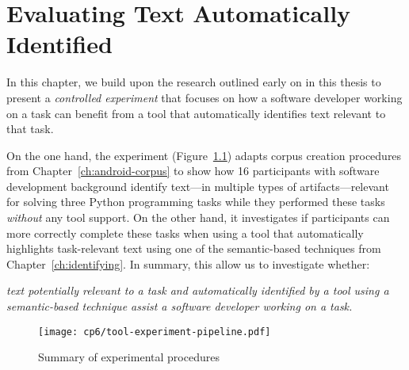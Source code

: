 \setcounter{chapter}{5}
\setcounter{rq}{1}


\chapter{Evaluating Text Automatically Identified}
\label{ch:assisting}




In this chapter, we build upon the research outlined  early on in this thesis to
present a \textit{controlled experiment} that focuses on how  a
software developer working on a task can benefit from a tool that automatically identifies text 
relevant to that task.



On the one hand, 
the experiment (Figure~\ref{fig:tool-experiment-procedures})
adapts corpus creation procedures from Chapter~\ref{ch:android-corpus}
to show how 16 participants with software development background identify 
text---in multiple types of artifacts---relevant for solving three Python programming tasks while they performed these tasks \textit{without} any tool support. 
On the other hand, 
it investigates if participants can more correctly complete these tasks 
when using a tool 
that  automatically highlights 
task-relevant text using one of the semantic-based techniques 
from Chapter~\ref{ch:identifying}. 
In summary, this allow us to investigate whether:

\medskip
\begin{bluequote}
    \textit{text potentially relevant to a task and automatically identified  by a tool using a semantic-based technique assist a software developer working on a task.}
\end{bluequote}



\begin{figure}
    \centering
    \texttt{[image: cp6/tool-experiment-pipeline.pdf]}
    \caption{Summary of experimental procedures}
    \label{fig:tool-experiment-procedures}
\end{figure}






